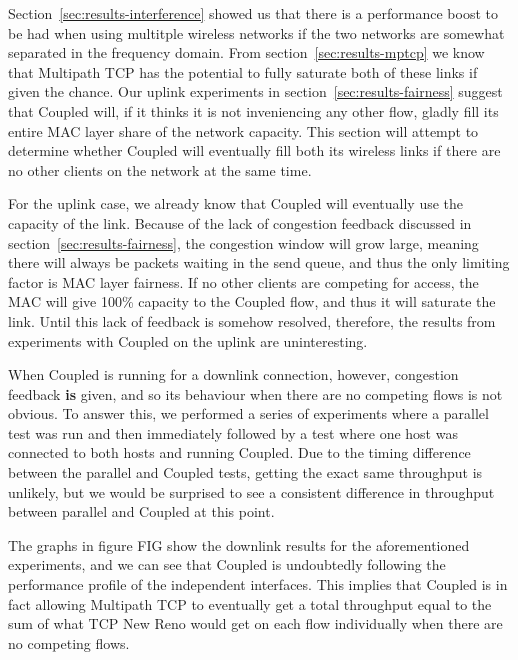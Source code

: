 Section~\ref{sec:results-interference} showed us that there is a performance
boost to be had when using multitple wireless networks if the two networks are
somewhat separated in the frequency domain. From section~\ref{sec:results-mptcp}
we know that Multipath TCP has the potential to fully saturate both of these
links if given the chance. Our uplink experiments in
section~\ref{sec:results-fairness} suggest that Coupled will, if it thinks it is
not inveniencing any other flow, gladly fill its entire MAC layer share of the
network capacity. This section will attempt to determine whether Coupled will
eventually fill both its wireless links if there are no other clients on the
network at the same time.

For the uplink case, we already know that Coupled will eventually use the
capacity of the link. Because of the lack of congestion feedback discussed in
section~\ref{sec:results-fairness}, the congestion window will grow large,
meaning there will always be packets waiting in the send queue, and thus the
only limiting factor is MAC layer fairness. If no other clients are competing
for access, the MAC will give 100\% capacity to the Coupled flow, and thus it
will saturate the link. Until this lack of feedback is somehow resolved,
therefore, the results from experiments with Coupled on the uplink are
uninteresting.

When Coupled is running for a downlink connection, however, congestion feedback
\textbf{is} given, and so its behaviour when there are no competing flows is
not obvious. To answer this, we performed a series of experiments where a
parallel test was run and then immediately followed by a test where one host was
connected to both hosts and running Coupled. Due to the timing difference
between the parallel and Coupled tests, getting the exact same throughput is
unlikely, but we would be surprised to see a consistent difference in throughput
between parallel and Coupled at this point.

The graphs in figure FIG show the downlink results for the aforementioned
experiments, and we can see that Coupled is undoubtedly following the
performance profile of the independent interfaces. This implies that Coupled is
in fact allowing Multipath TCP to eventually get a total throughput equal to the
sum of what TCP New Reno would get on each flow individually when there are no
competing flows.
